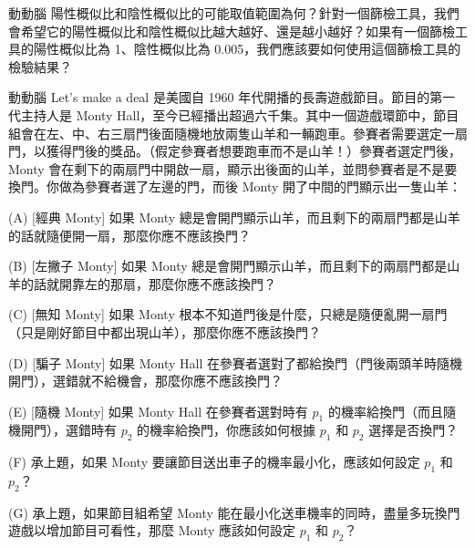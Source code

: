     \bigskip

    \begin{custom}{動動腦}
        陽性概似比和陰性概似比的可能取值範圍為何？針對一個篩檢工具，我們會希望它的陽性概似比和陰性概似比越大越好、還是越小越好？如果有一個篩檢工具的陽性概似比為 1、陰性概似比為 0.005，我們應該要如何使用這個篩檢工具的檢驗結果？
    \end{custom}

    \answerbox{180pt}

    \begin{custom}{動動腦}
        Let's make a deal 是美國自 1960 年代開播的長壽遊戲節目。節目的第一代主持人是 Monty Hall，至今已經播出超過六千集。其中一個遊戲環節中，節目組會在左、中、右三扇門後面隨機地放兩隻山羊和一輛跑車。參賽者需要選定一扇門，以獲得門後的獎品。（假定參賽者想要跑車而不是山羊！）參賽者選定門後，Monty 會在剩下的兩扇門中開啟一扇，顯示出後面的山羊，並問參賽者是不是要換門。你做為參賽者選了左邊的門，而後 Monty 開了中間的門顯示出一隻山羊：
        
        (A) [經典 Monty] 如果 Monty 總是會開門顯示山羊，而且剩下的兩扇門都是山羊的話就隨便開一扇，那麼你應不應該換門？
        
        (B) [左撇子 Monty] 如果 Monty 總是會開門顯示山羊，而且剩下的兩扇門都是山羊的話就開靠左的那扇，那麼你應不應該換門？

        (C) [無知 Monty] 如果 Monty 根本不知道門後是什麼，只總是隨便亂開一扇門（只是剛好節目中都出現山羊），那麼你應不應該換門？
        
        (D) [騙子 Monty] 如果 Monty Hall 在參賽者選對了都給換門（門後兩頭羊時隨機開門），選錯就不給機會，那麼你應不應該換門？
                
        (E) [隨機 Monty] 如果 Monty Hall 在參賽者選對時有 $p_1$ 的機率給換門（而且隨機開門），選錯時有 $p_2$ 的機率給換門，你應該如何根據 $p_1$ 和 $p_2$ 選擇是否換門？

        (F) 承上題，如果 Monty 要讓節目送出車子的機率最小化，應該如何設定 $p_1$ 和 $p_2$？

        (G) 承上題，如果節目組希望 Monty 能在最小化送車機率的同時，盡量多玩換門遊戲以增加節目可看性，那麼 Monty 應該如何設定 $p_1$ 和 $p_2$？

    \end{custom}

    \answerbox{320pt}
    
    \bigskip

